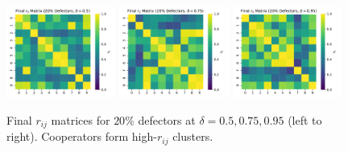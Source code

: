 \documentclass[11pt]{article}
\begin{document}
\begin{figure}[h]
  \centering
  \includegraphics[width=0.32\textwidth]{rij_heatmap_20pct_delta_05.pdf}\hfill
  \includegraphics[width=0.32\textwidth]{rij_heatmap_20pct_delta_075.pdf}\hfill
  \includegraphics[width=0.32\textwidth]{rij_heatmap_20pct_delta_095.pdf}
  \caption{Final $r_{ij}$ matrices for $20\%$ defectors at $\delta=0.5,0.75,0.95$ (left to right). Cooperators form high-$r_{ij}$ clusters.}
\end{figure}
\end{document}
